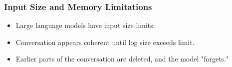

\begin{frame}[fragile]\frametitle{Input Size and Memory Limitations}
\begin{itemize}
    \item Large language models have input size limits.
    \item Conversation appears coherent until log size exceeds limit.
    \item Earlier parts of the conversation are deleted, and the model "forgets."
\end{itemize}
\end{frame}

